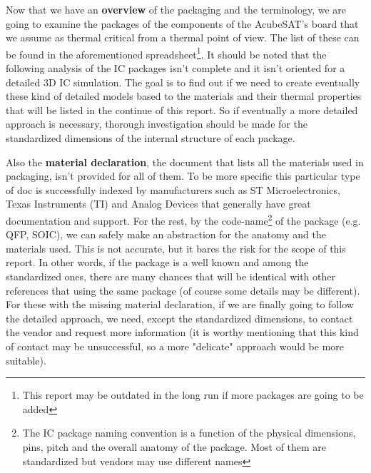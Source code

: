 \documentclass[final]{cubedoc}
\begin{document}
	
	
	
	Now that we have an \textbf{overview} of the packaging and the terminology, we are going to examine the packages of the components of the AcubeSAT's board that we assume as thermal critical from a thermal point of view. The list of these can be found in the aforementioned spreadsheet\footnote{This report may be outdated in the long run if more packages are going to be added}. It should be noted that the following analysis of the IC packages isn't complete and it isn't oriented for a detailed 3D IC simulation. The goal is to find out if we need to create eventually these kind of detailed models based to the materials and their thermal properties that will be listed in the continue of this report. So if eventually a more detailed approach  is necessary, thorough investigation should be made for the standardized dimensions of the internal structure of each package. 
	
	Also the \textbf{material declaration}, the document that lists all the materials used in packaging, isn't provided for all of them. To be more specific this particular type of doc is successfully indexed by manufacturers such as ST Microelectronics, Texas Instruments (TI) and Analog Devices that generally have great documentation and support. For the rest, by the code-name\footnote{The IC package naming convention is a function of the physical dimensions, pins, pitch and the overall anatomy of the package. Most of them are standardized but vendors may use different names} of the package (e.g. QFP, SOIC), we can safely make an abstraction for the anatomy and the materials used. This is not accurate, but it bares the risk for the scope of this report. In other words, if the package is a well known and among the standardized ones, there are many chances that will be identical with other references that using the same package (of course some details may be different). For these with the missing material declaration, if we are finally going to follow the detailed approach, we need, except the standardized dimensions, to contact the vendor and request more information (it is worthy mentioning that this kind of contact may be unsuccessful, so a more "delicate" approach would be more suitable). 
	
\end{document}
